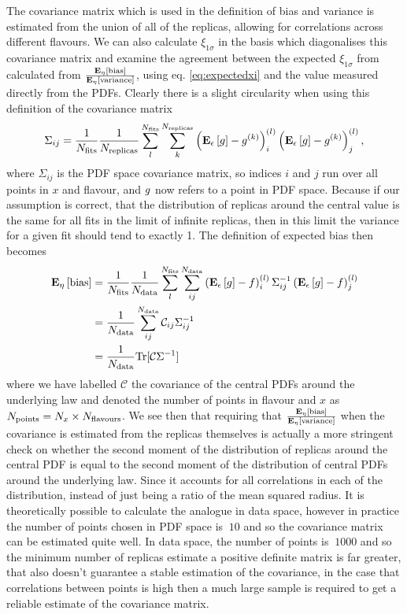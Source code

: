 The covariance matrix which is used in the definition of bias and variance is
estimated from the union of all of the replicas, allowing for correlations
across different flavours. We can also calculate $\xi_{1\sigma}$ in the basis
which diagonalises this covariance matrix and examine the
agreement between the expected $\xi_{1\sigma}$ from calculated from
$\frac{\mathbf{E}_{\eta}\left[ {\rm bias} \right]}{\mathbf{E}_{\eta}\left[ {\rm variance} \right]}$, using eq. \eqref{eq:expectedxi} and
the value measured directly from the PDFs. Clearly there is a slight circularity
when using this definition of the covariance matrix
\begin{equation}
    \Sigma_{ij} = \frac{1}{N_{\rm fits}}\frac{1}{N_{\rm replicas}} \sum_{l}^{N_{\rm fits}} \sum_{k}^{N_{\rm replicas}} \left( \mathbf{E}_{\epsilon}\left[ g \right] - g^{(k)}\right)^{(l)}_i \left( \mathbf{E}_{\epsilon}\left[ g \right] - g^{(k)}\right)^{(l)}_j ,
\end{equation}
where $\Sigma_{ij}$ is the PDF space covariance matrix, so indices $i$ and $j$
run over all points in $x$ and flavour, and $g$ now refers to a point in
PDF space. Because if our assumption is correct, that the distribution of
replicas around the central value is the same for all fits in the limit of infinite
replicas, then in this limit the variance for a given fit should tend to
exactly 1. The definition of expected bias then becomes
\begin{equation}
    \begin{split}
        \mathbf{E}_{\eta}\left[ {\rm bias} \right] &= \frac{1}{N_{\rm fits}} \frac{1}{N_{\rm data}} \sum^{N_{\rm fits}}_{l} \sum^{N_{\rm data}}_{ij}
    \left( \mathbf{E}_{\epsilon}\left[ g \right] - f \right)^{(l)}_{i} \Sigma^{-1}_{ij} \left( \mathbf{E}_{\epsilon}\left[ g \right] - f \right)^{(l)}_{j} \\
    &= \frac{1}{N_{\rm data}} \sum_{ij}^{N_{\rm data}} \mathcal{C}_{ij} \Sigma^{-1}_{ij} \\
    &= \frac{1}{N_{\rm data}} {\rm Tr}[\mathcal{C}\Sigma^{-1}]
    \end{split}
\end{equation}
where we have labelled $\mathcal{C}$ the covariance of the central PDFs around
the underlying law and denoted the number of points in flavour and $x$ as
$N_{\rm points} = N_{x} \times N_{\rm flavours}$. We see then that requiring that
$\frac{\mathbf{E}_{\eta}\left[ {\rm bias} \right]}{\mathbf{E}_{\eta}\left[ {\rm variance} \right]}$
when the covariance is estimated from the replicas themselves is actually
a more stringent check on whether the second moment of the distribution of
replicas around the central PDF is equal to the second moment of the distribution
of central PDFs around the underlying law. Since it accounts for all correlations
in each of the distribution, instead of just being a ratio of the mean squared
radius.
It is theoretically possible
to calculate the analogue in data space, however in practice the number of points
chosen in PDF space is $~10$ and so the covariance matrix can be estimated quite
well. In data space, the number of points is $~1000$ and so the minimum number
of replicas estimate a positive definite matrix is far greater, that also doesn't
guarantee a stable estimation of the covariance, in the case that correlations
between points is high then a much large sample is required to get a reliable
estimate of the covariance matrix.
